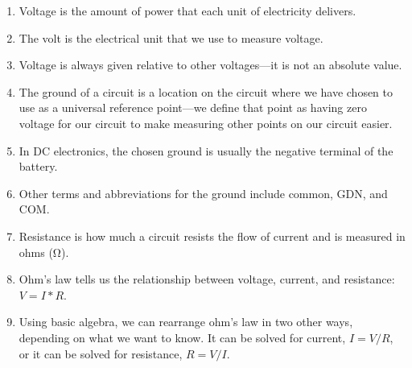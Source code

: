 \begin{enumerate}
\item Voltage is the amount of power that each unit of electricity delivers.
\item The volt is the electrical unit that we use to measure voltage.
\item Voltage is always given relative to other voltages---it is not an absolute value.
\item The ground of a circuit is a location on the circuit where we have chosen to use as a universal reference point---we define that point as having zero voltage for our circuit to make measuring other points on our circuit easier.
\item In DC electronics, the chosen ground is usually the negative terminal of the battery.
\item Other terms and abbreviations for the ground include common, GDN, and COM.
\item Resistance is how much a circuit resists the flow of current and is measured in ohms (\si{\ohm}).
\item Ohm's law tells us the relationship between voltage, current, and resistance: $V = I * R$.
\item Using basic algebra, we can rearrange ohm's law in two other ways, depending on what we want to know.  It can be solved for current, $I = V /R$, or it can be solved for resistance, $R = V / I$.
\end{enumerate}

\applysection


